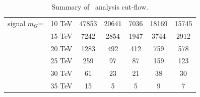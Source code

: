 \begin{table}[!htb]
{\begin{tabular}{|c|c|c|c|c|c|c|}
\hline
signal $m_{G}$= & 10 TeV        & 47853     & 20641   & 7036   & 18169  & 15745 \\
                & 15 TeV        & 7242      & 2854    & 1947   & 3744   & 2912  \\
                & 20 TeV        & 1283      & 492     & 412    & 759    & 578   \\
                & 25 TeV        & 259       & 97      & 87     & 159    & 123   \\
                & 30 TeV        & 61        & 23      & 21     & 38     & 30    \\
                & 35 TeV        & 15        & 5       & 5      & 9      & 7     \\
\hline
\hline
\end{tabular}}
\caption{Summary of \rsg\ analysis cut-flow.}
\label{tab:RSGww_cutflow}
\end{table}

\clearpage
\newpage

%
%
%
